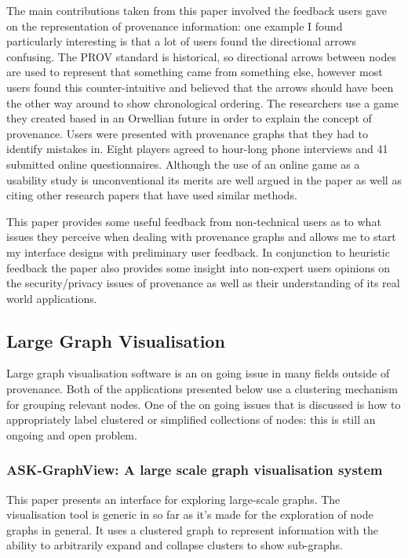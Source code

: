 The main contributions taken from this paper involved the feedback users gave on the representation of provenance information: one example I found particularly interesting is that a lot of users found the directional arrows confusing. The PROV standard is historical, so directional arrows between nodes are used to represent that something came from something else, however most users found this counter-intuitive and believed that the arrows should have been the other way around to show chronological ordering. The researchers use a game they created based in an Orwellian future in order to explain the concept of provenance. Users were presented with provenance graphs that they had to identify mistakes in. Eight players agreed to hour-long phone interviews and 41 submitted online questionnaires. Although the use of an online game as a usability study is unconventional its merits are well argued in the paper as well as citing other research papers that have used similar methods.

This paper provides some useful feedback from non-technical users as to what issues they perceive when dealing with provenance graphs and allows me to start my interface designs with preliminary user feedback. In conjunction to heuristic feedback the paper also provides some insight into non-expert users opinions on the security/privacy issues of provenance as well as their understanding of its real world applications.

\subsection{Large Graph Visualisation}
\label{sub:large_graph_visualisation}

Large graph visualisation software is an on going issue in many fields outside of provenance. Both of the applications presented below use a clustering mechanism for grouping relevant nodes. One of the on going issues that is discussed is how to appropriately label clustered or simplified collections of nodes: this is still an ongoing and open problem.

\subsubsection{ASK-GraphView: A large scale graph visualisation system\cite{Abello2006}}
\label{sub:ask_graphview_a_large_scale_graph_visualisation_system}

This paper presents an interface for exploring large-scale graphs. The visualisation tool is generic in so far as it's made for the exploration of node graphs in general. It uses a clustered graph to represent information with the ability to arbitrarily expand and collapse clusters to show sub-graphs.

